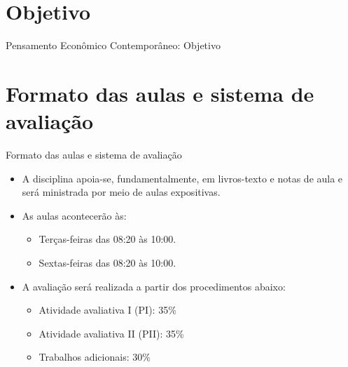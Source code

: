 \documentclass[10pt]{beamer}
\begin{document}
\section{Objetivo}
\begin{frame}{Pensamento Econômico Contemporâneo: Objetivo}
    \begin{center}
        \begin{minipage}{.8\textwidth}
        \end{minipage}
    \end{center}
\end{frame}

\section{Formato das aulas e sistema de avaliação}
\begin{frame}{Formato das aulas e sistema de avaliação}
    \begin{itemize}
        \item A disciplina apoia-se, fundamentalmente, em livros-texto e notas de aula e será ministrada por meio de aulas expositivas.\bigskip

        \item As aulas acontecerão às:\medskip
              \begin{itemize}
                  \item Terças-feiras das 08:20 às 10:00.\medskip
                  \item Sextas-feiras das 08:20 às 10:00.\bigskip
              \end{itemize}

        \item A avaliação será realizada a partir dos procedimentos abaixo:\medskip
              \begin{itemize}
                  \item Atividade avaliativa I (PI): 35\%\medskip
                  \item Atividade avaliativa II (PII): 35\%\medskip                  
                  \item Trabalhos adicionais: 30\%
              \end{itemize}
    \end{itemize}
\end{frame}
\end{document}
